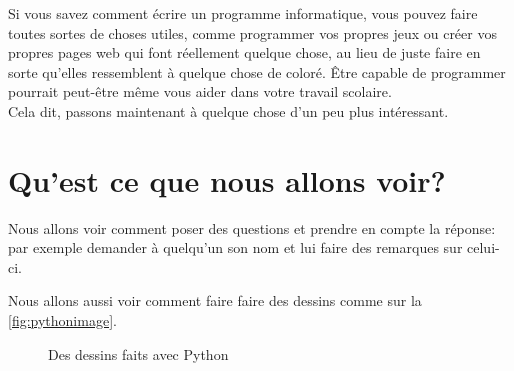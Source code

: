 Si vous savez comment écrire un programme informatique, vous pouvez faire toutes sortes de choses utiles, comme programmer vos propres jeux ou créer vos propres pages web qui font réellement quelque chose, au lieu de juste faire en sorte qu'elles ressemblent à quelque chose de coloré. Être capable de programmer pourrait peut-être même vous aider dans votre travail scolaire.\\


Cela dit, passons maintenant à quelque chose d'un peu plus intéressant.

\section{Qu'est ce que nous allons voir?}
Nous allons voir comment poser des questions et prendre en compte la réponse: par exemple demander à quelqu'un son nom et lui faire des remarques sur celui-ci.

Nous allons aussi voir comment faire faire des dessins comme sur la \autoref{fig:pythonimage}.

\begin{figure}[h!]
\capstart
\centering
{}
\caption{Des dessins faits avec Python}\label{fig:pythonimage}
\end{figure}

